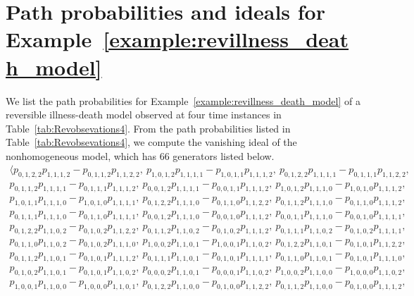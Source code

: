 \documentclass[11pt, a4paper]{article}
\numberwithin{equation}{section}
\theoremstyle{plain}
\theoremstyle{definition}
\begin{document}
\section{Path probabilities and ideals for 
Example~\ref{example:revillness_death_model}
}\label{sec:appendix}
{\renewcommand{\arraystretch}{1.2}%
We list the path probabilities for Example~\ref{example:revillness_death_model} of a reversible illness-death model observed at four time instances in Table~\ref{tab:Revobsevations4}. From the path probabilities listed in Table~\ref{tab:Revobsevations4}, we compute the vanishing ideal of the nonhomogeneous model, which has 
66 generators listed below.
\begin{gather*}
    \langle p_{0, 1, 2, 2}p_{1, 1, 1, 2}-p_{0, 1, 1, 2}p_{1, 1, 2, 2},\ p_{1, 0, 1, 2}p_{1, 1, 1, 1}-p_{1, 0, 1, 1}p_{1, 1, 1, 2},\ p_{0, 1, 2, 2}p_{1, 1, 1, 1}-p_{0, 1, 1, 1}p_{1, 1, 2, 2},\\
    p_{0, 1, 1, 2}p_{1, 1,1, 1}-p_{0, 1, 1, 1}p_{1, 1, 1, 2},\ p_{0, 0, 1, 2}p_{1, 1, 1, 1}-p_{0, 0, 1, 1}p_{1, 1, 1, 2},\ p_{1, 0, 1, 2}p_{1, 1, 1, 0}-p_{1, 0, 1, 0}p_{1, 1, 1, 2},\\
    p_{1, 0, 1, 1}p_{1, 1, 1, 0}-p_{1, 0, 1,0}p_{1, 1, 1, 1},\ p_{0, 1, 2, 2}p_{1, 1, 1, 0}-p_{0, 1, 1, 0}p_{1, 1, 2, 2},\ p_{0, 1, 1, 2}p_{1, 1, 1, 0}-p_{0, 1, 1, 0}p_{1, 1, 1, 2},\\
    p_{0, 1, 1, 1}p_{1, 1, 1, 0}-p_{0, 1, 1, 0}p_{1, 1, 1, 1},\ p_{0,0, 1, 2}p_{1, 1, 1, 0}-p_{0, 0, 1, 0}p_{1, 1, 1, 2},\ p_{0, 0, 1, 1}p_{1, 1, 1, 0}-p_{0, 0, 1, 0}p_{1, 1, 1, 1},\\
    p_{0, 1, 2, 2}p_{1, 1, 0, 2}-p_{0, 1, 0, 2}p_{1, 1, 2, 2},\ p_{0, 1, 1, 2}p_{1, 1, 0,2}-p_{0, 1, 0, 2}p_{1, 1, 1, 2},\ p_{0, 1, 1, 1}p_{1, 1, 0, 2}-p_{0, 1, 0, 2}p_{1, 1, 1, 1},\\
    p_{0, 1, 1, 0}p_{1, 1, 0, 2}-p_{0, 1, 0, 2}p_{1, 1, 1, 0},\ p_{1, 0, 0, 2}p_{1, 1, 0, 1}-p_{1, 0, 0, 1}p_{1,1, 0, 2},\ p_{0, 1, 2, 2}p_{1, 1, 0, 1}-p_{0, 1, 0, 1}p_{1, 1, 2, 2},\\
    p_{0, 1, 1, 2}p_{1, 1, 0, 1}-p_{0, 1, 0, 1}p_{1, 1, 1, 2},\ p_{0, 1, 1, 1}p_{1, 1, 0, 1}-p_{0, 1, 0, 1}p_{1, 1, 1, 1},\ p_{0, 1, 1,0}p_{1, 1, 0, 1}-p_{0, 1, 0, 1}p_{1, 1, 1, 0},\\
    p_{0, 1, 0, 2}p_{1, 1, 0, 1}-p_{0, 1, 0, 1}p_{1, 1, 0, 2},\ p_{0, 0, 0, 2}p_{1, 1, 0, 1}-p_{0, 0, 0, 1}p_{1, 1, 0, 2},\ p_{1, 0, 0, 2}p_{1, 1, 0, 0}-p_{1,0, 0, 0}p_{1, 1, 0, 2},\\
    p_{1, 0, 0, 1}p_{1, 1, 0, 0}-p_{1, 0, 0, 0}p_{1, 1, 0, 1},\ p_{0, 1, 2, 2}p_{1, 1, 0, 0}-p_{0, 1, 0, 0}p_{1, 1, 2, 2},\ p_{0, 1, 1, 2}p_{1, 1, 0, 0}-p_{0, 1, 0, 0}p_{1, 1, 1, 2},\\

\end{gather*}}
\end{document}
